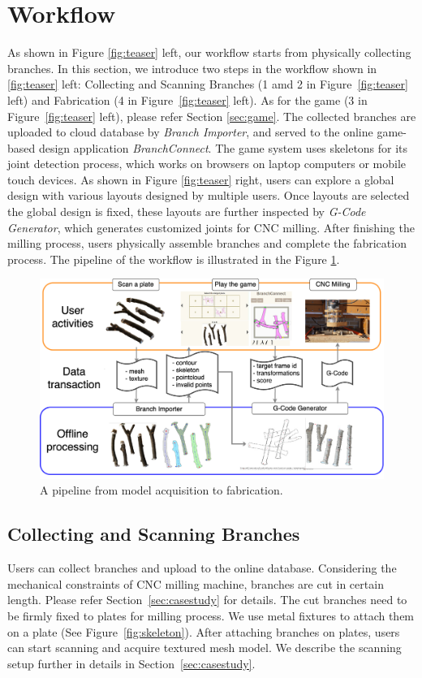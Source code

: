 \section{Workflow}
As shown in Figure \ref{fig:teaser} left, our workflow starts from physically collecting branches.
In this section, we introduce two steps in the workflow shown in \ref{fig:teaser} left: Collecting and Scanning Branches (1 amd 2 in Figure~\ref{fig:teaser} left) and Fabrication (4 in Figure~\ref{fig:teaser} left).
As for the game (3 in Figure~\ref{fig:teaser} left), please refer Section \ref{sec:game}.
The collected branches are uploaded to cloud database by \textit{Branch Importer}, and served to the online game-based design application \textit{BranchConnect}.
The game system uses skeletons for its joint detection process, which works on browsers on laptop computers or mobile touch devices.
As shown in Figure \ref{fig:teaser} right, users can explore a global design with various layouts designed by multiple users.
Once layouts are selected the global design is fixed, these layouts are further inspected by \textit{G-Code Generator}, which generates customized joints for CNC milling.
After finishing the milling process, users physically assemble branches and complete the fabrication process.
The pipeline of the workflow is illustrated in the Figure \ref{fig:pipeline}.

\begin{figure}[ht]
  \begin{center}
    \includegraphics[width = 0.4\paperwidth]{images/workflow/pipeline.png}
    \caption{A pipeline from model acquisition to fabrication.}
    \label{fig:pipeline}
  \end{center}
\end{figure}

\subsection{Collecting and Scanning Branches}
Users can collect branches and upload to the online database.
Considering the mechanical constraints of CNC milling machine, branches are cut in certain length.
Please refer Section~\ref{sec:casestudy} for details.
The cut branches need to be firmly fixed to plates for milling process.
We use metal fixtures to attach them on a plate (See Figure~\ref{fig:skeleton}).
After attaching branches on plates, users can start scanning and acquire textured mesh model.
We describe the scanning setup further in details in Section~\ref{sec:casestudy}.

